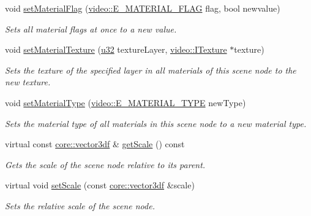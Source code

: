 \begin{DoxyCompactItemize}
void \hyperlink{classirr_1_1scene_1_1ISceneNode_a2841d5077854b9981711a403f33762cd}{set\+Material\+Flag} (\hyperlink{namespaceirr_1_1video_a8a3bc00ae8137535b9fbc5f40add70d3}{video\+::\+E\+\_\+\+M\+A\+T\+E\+R\+I\+A\+L\+\_\+\+F\+L\+AG} flag, bool newvalue)
\begin{DoxyCompactList}\small\item\em Sets all material flags at once to a new value. \end{DoxyCompactList}\item 
void \hyperlink{classirr_1_1scene_1_1ISceneNode_a0d5d2e05ebe08e6a432fbb4fd1d28dd0}{set\+Material\+Texture} (\hyperlink{namespaceirr_a0416a53257075833e7002efd0a18e804}{u32} texture\+Layer, \hyperlink{classirr_1_1video_1_1ITexture}{video\+::\+I\+Texture} $\ast$texture)
\begin{DoxyCompactList}\small\item\em Sets the texture of the specified layer in all materials of this scene node to the new texture. \end{DoxyCompactList}\item 
void \hyperlink{classirr_1_1scene_1_1ISceneNode_a302c7dedd776b52111823df5ed8446de}{set\+Material\+Type} (\hyperlink{namespaceirr_1_1video_ac8e9b6c66f7cebabd1a6d30cbc5430f1}{video\+::\+E\+\_\+\+M\+A\+T\+E\+R\+I\+A\+L\+\_\+\+T\+Y\+PE} new\+Type)
\begin{DoxyCompactList}\small\item\em Sets the material type of all materials in this scene node to a new material type. \end{DoxyCompactList}\item 
virtual const \hyperlink{namespaceirr_1_1core_a06f169d08b5c429f5575acb7edbad811}{core\+::vector3df} \& \hyperlink{classirr_1_1scene_1_1ISceneNode_a97a5963f8b7b3cdf6fa196863c641c1d}{get\+Scale} () const
\begin{DoxyCompactList}\small\item\em Gets the scale of the scene node relative to its parent. \end{DoxyCompactList}\item 
virtual void \hyperlink{classirr_1_1scene_1_1ISceneNode_a1d710e1e20546bd89affe09fa943b0e2}{set\+Scale} (const \hyperlink{namespaceirr_1_1core_a06f169d08b5c429f5575acb7edbad811}{core\+::vector3df} \&scale)
\begin{DoxyCompactList}\small\item\em Sets the relative scale of the scene node. \end{DoxyCompactList}\item 

\end{DoxyCompactItemize}
